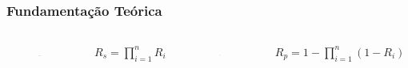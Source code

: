 \documentclass{beamer}
\begin{document}
    \begin{frame}

        \frametitle{Fundamentação Teórica}

        \begin{columns}[c] 
    
                \begin{figure}[t]
                    \includegraphics[width=0.96\textwidth]{img/EX_RBD_S.eps}
                \end{figure}
    
                \begin{align*}
                        R_{s} = \prod_{i = 1}^{n} R_i
                \end{align*}
    
        
                \begin{figure}[ht]
                    \includegraphics[width=0.56\textwidth]{img/EX_RBD_P.eps}
                \end{figure}
        
                \begin{align*}
                        R_{p} = 1 - \prod_{i = 1}^{n} (1 - R_i)
                \end{align*}
    
        \end{columns}

    \end{frame}
\end{document}
